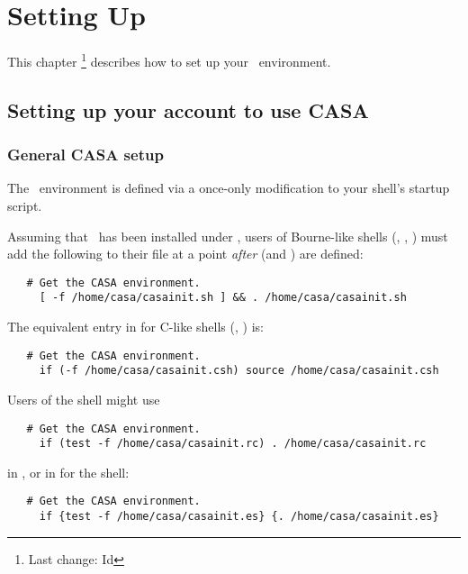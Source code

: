 \chapter{Setting Up}
\label{Setting Up}

This chapter \footnote{Last change:
$ $Id$ $}
describes how to set up your \aipspp\ environment.


\section{Setting up your account to use CASA}
\label{Setup}

\subsection{General CASA setup}

The \aipspp\ environment is defined via a once-only modification to your
shell's startup script.

Assuming that \aipspp\ has been installed under , users of
Bourne-like shells (, , ) must add the
following to their  file at a point {\em after} 
(and ) are defined:

\begin{verbatim}
   # Get the CASA environment.
     [ -f /home/casa/casainit.sh ] && . /home/casa/casainit.sh
\end{verbatim}

\noindent
The equivalent entry in  for C-like shells (,
) is:

\begin{verbatim}
   # Get the CASA environment.
     if (-f /home/casa/casainit.csh) source /home/casa/casainit.csh
\end{verbatim}

\noindent
Users of the  shell might use

\begin{verbatim}
   # Get the CASA environment.
     if (test -f /home/casa/casainit.rc) . /home/casa/casainit.rc
\end{verbatim}

\noindent
in , or in  for the  shell:

\begin{verbatim}
   # Get the CASA environment.
     if {test -f /home/casa/casainit.es} {. /home/casa/casainit.es}
\end{verbatim}

